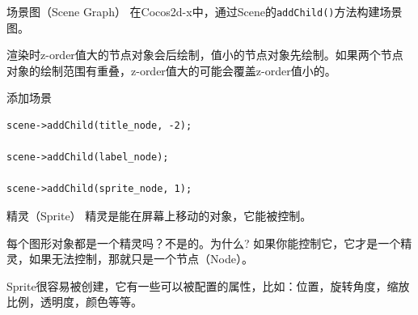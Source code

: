 \documentclass{beamer}
\begin{document}

\begin{frame}[fragile]{场景图（Scene Graph）}
在Cocos2d-x中，通过Scene的\texttt{addChild()}方法构建场景图。

\vspace{1em}

渲染时z-order值大的节点对象会后绘制，值小的节点对象先绘制。如果两个节点对象的绘制范围有重叠，z-order值大的可能会覆盖z-order值小的。

\begin{block}{添加场景}
\begin{verbatim}
scene->addChild(title_node, -2);

scene->addChild(label_node);

scene->addChild(sprite_node, 1);
\end{verbatim}
\end{block}
\end{frame}


\begin{frame}[fragile]{精灵（Sprite）}
精灵是能在屏幕上移动的对象，它能被控制。

\vspace{1em}

每个图形对象都是一个精灵吗？不是的。为什么? 如果你能控制它，它才是一个精灵，如果无法控制，那就只是一个节点（Node）。

\vspace{1em}

Sprite很容易被创建，它有一些可以被配置的属性，比如：位置，旋转角度，缩放比例，透明度，颜色等等。
\end{frame}

\end{document}
